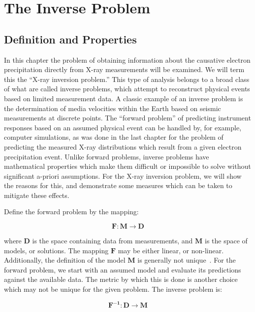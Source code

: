 \chapter{The Inverse Problem}

\section{Definition and Properties}

In this chapter the problem of obtaining information about the causative electron precipitation directly from X-ray measurements will be examined. We will term this the ``X-ray inversion problem.'' This type of analysis belongs to a broad class of what are called inverse problems, which attempt to reconstruct physical events based on limited measurement data.  A classic example of an inverse problem is the determination of media velocities within the Earth based on seismic measurements at discrete points. The ``forward problem'' of predicting instrument responses based on an assumed physical event can be handled by, for example, computer simulations, as was done in the last chapter for the problem of predicting the measured X-ray distributions which result from a given electron precipitation event. Unlike forward problems, inverse problems have mathematical properties which make them difficult or impossible to solve without  significant a-priori assumptions. For the X-ray inversion problem, we will show the reasons for this, and demonstrate some measures which can be taken to mitigate these effects.

Define the forward problem by the mapping:

\begin{equation}
\mathbf{F}:\mathbf{M} \rightarrow \mathbf{D}
\end{equation}

where $\mathbf{D}$ is the space containing data from measurements, and $\mathbf{M}$ is the space of models, or solutions. The mapping $\mathbf{F}$ may be either linear, or non-linear. Additionally, the definition of the model $\mathbf{M}$ is generally not unique~\cite{Tarantola2004}. For the forward problem, we start with an assumed model and evaluate its predictions against the available data. The metric by which this is done is another choice which may not be unique for the given problem. The inverse problem is:

\begin{equation}
\mathbf{F^{-1}}:\mathbf{D} \rightarrow \mathbf{M}
\end{equation}

